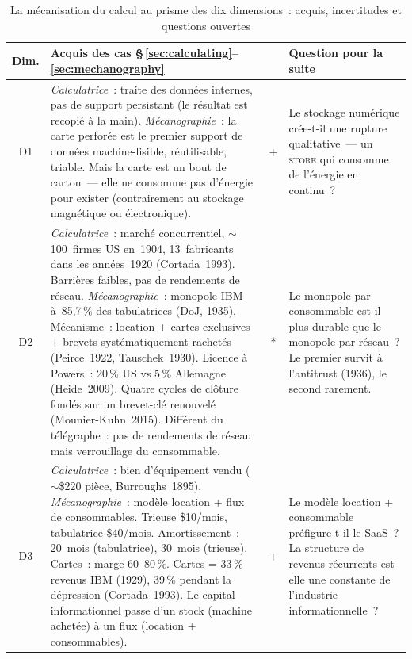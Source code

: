 
\begin{table}[p]
\caption{La mécanisation du calcul au prisme des dix dimensions~: acquis, incertitudes et questions ouvertes}\label{tab:compute-dimensions-v2}
\centering\footnotesize
\renewcommand{\arraystretch}{1.15}
\begin{tabularx}{\textwidth}{@{}cXcp{4.5cm}@{}}
\toprule
\textbf{Dim.} & \textbf{Acquis des cas §\,\ref{sec:calculating}--\ref{sec:mechanography}} & & \textbf{Question pour la suite} \\
\midrule

D1 &
\emph{Calculatrice}~: traite des données internes, pas de support persistant (le résultat est recopié à la main). \emph{Mécanographie}~: la carte perforée est le premier support de données machine-lisible, réutilisable, triable. Mais la carte est un bout de carton~--- elle ne consomme pas d'énergie pour exister (contrairement au stockage magnétique ou électronique). & + &
Le stockage numérique crée-t-il une rupture qualitative~--- un \textsc{store} qui consomme de l'énergie en continu~? \\[4pt]

D2 &
\emph{Calculatrice}~: marché concurrentiel, $\sim$100~firmes US en~1904, 13~fabricants dans les années~1920 (Cortada~1993). Barrières faibles, pas de rendements de réseau. \emph{Mécanographie}~: monopole IBM à~85,7\,\% des tabulatrices (DoJ, 1935). Mécanisme~: location + cartes exclusives + brevets systématiquement rachetés (Peirce~1922, Tauschek~1930). Licence à Powers~: 20\,\% US vs 5\,\% Allemagne (Heide~2009). Quatre cycles de clôture fondés sur un brevet-clé renouvelé (Mounier-Kuhn~2015). Différent du télégraphe~: pas de rendements de réseau mais verrouillage du consommable. & * &
Le monopole par consommable est-il plus durable que le monopole par réseau~? Le premier survit à l'antitrust (1936), le second rarement. \\[4pt]

D3 &
\emph{Calculatrice}~: bien d'équipement vendu ($\sim$\$220 pièce, Burroughs~1895). \emph{Mécanographie}~: modèle location + flux de consommables. Trieuse \$10/mois, tabulatrice \$40/mois. Amortissement~: 20~mois (tabulatrice), 30~mois (trieuse). Cartes~: marge 60--80\,\%. Cartes = 33\,\% revenus IBM (1929), 39\,\% pendant la dépression (Cortada~1993). Le capital informationnel passe d'un stock (machine achetée) à un flux (location + consommables). & + &
Le modèle location + consommable préfigure-t-il le SaaS~? La structure de revenus récurrents est-elle une constante de l'industrie informationnelle~? \\[4pt]


\end{tabularx}
\end{table}

